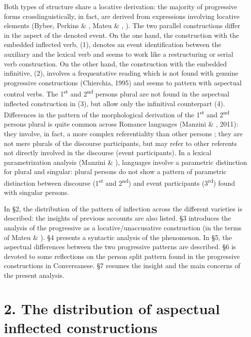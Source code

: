 \documentclass[output=paper]{langsci/langscibook}
\begin{document}
Both types of structure share a locative derivation: the majority of progressive forms crosslinguistically, in fact, are derived from expressions involving locative elements (Bybee, Perkins \& \citealt{Pagliuca1994}, Mateu \& \citealt{Amadas1999}, \citealt{Laka2006}). The two parallel constructions differ in the aspect of the denoted event. On the one hand, the construction with the embedded inflected verb, (1), denotes an event identification between the auxiliary and the lexical verb and seems to work like a restructuring or serial verb construction. On the other hand, the construction with the embedded infinitive, (2), involves a frequentative reading which is not found with genuine progressive constructions (Chierchia, 1995) and seems to pattern with aspectual control verbs. The 1\textsuperscript{st} and 2\textsuperscript{nd} persons plural are not found in the aspectual inflected construction in (3), but allow only the infinitival counterpart (4). Differences in the pattern of the morphological derivation of the 1\textsuperscript{st} and 2\textsuperscript{nd} persons plural is quite common across Romance languages (Manzini \& \citealt{Savoia2005}, 2011): they involve, in fact, a more complex referentiality than other persons \citep{Bobalijk2008}; they are not mere plurals of the discourse participants, but may refer to other referents not directly involved in the discourse (event participants). In a lexical parametrization analysis (Manzini \& \citealt{Savoia2011}), languages involve a parametric distinction for plural and singular: plural persons do not show a pattern of parametric distinction between discourse (1\textsuperscript{st} and 2\textsuperscript{nd}) and event participants (3\textsuperscript{rd}) found with singular persons. 

In §2, the distribution of the pattern of inflection across the different varieties is described: the insights of previous accounts are also listed. §3 introduces the analysis of the progressive as a locative/unaccusative construction (in the terms of Mateu \& \citealt{Amadas1999}). §4 presents a syntactic analysis of the phenomenon. In §5, the aspectual differences between the two progressive patterns are described. §6 is devoted to some reflections on the person split pattern found in the progressive constructions in Conversanese. §7 resumes the insight and the main concerns of the present analysis. 

\section{ 2. The distribution of aspectual inflected constructions}
\end{document}
